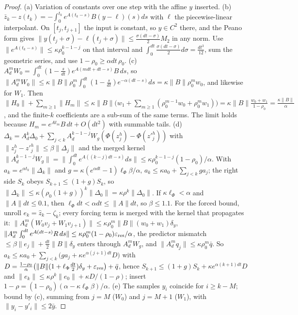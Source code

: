 \begin{proof}
(a) Variation of constants over one step with the affine $y$ inserted.
(b) $\bar z_k-z(t_k)=-\int_0^{t_k}e^{A(t_k-s)}B(y-\ell)(s)ds$ with $\ell$ the piecewise-linear
interpolant. On $[t_j,t_{j+1}]$ the input is constant, so $y\in C^2$ there, and the Peano form gives
$\|y(t_j+\sigma)-\ell(t_j+\sigma)\|\le\tfrac{\sigma(dt-\sigma)}2M_2$ in any norm. Use
$\|e^{A(t_k-s)}\|\le\kappa\rho_0^{k-1-j}$ on that interval and $\int_0^{dt}\tfrac{\sigma(dt-\sigma)}2d\sigma=\tfrac{dt^3}{12}$,
sum the geometric series, and use $1-\rho_0\ge\alpha dt\,\rho_0$.
(c) $A_d^mW_0=\int_0^{dt}(1-\tfrac s{dt})e^{A(mdt+dt-s)}B\,ds$, so
$\|A_d^mW_0\|\le\kappa\|B\|\rho_0^m\int_0^{dt}(1-\tfrac s{dt})e^{-\alpha(dt-s)}ds=\kappa\|B\|\rho_0^mw_0$, and likewise
for $W_1$. Then $\|H_0\|+\sum_{m\ge1}\|H_m\|\le\kappa\|B\|\big(w_1+\sum_{m\ge1}(\rho_0^{m-1}w_0+\rho_0^mw_1)\big)=\kappa\|B\|\frac{w_0+w_1}{1-\rho_0}=\frac{\kappa\|B\|}\alpha$,
and the finite-$k$ coefficients are a sub-sum of the same terms. The limit holds because
$H_m=e^{At_m}B\,dt+O(dt^2)$ with summable tails.
(d) $\Delta_k=A_d^k\Delta_0+\sum_{j<k}A_d^{k-1-j}W_g(\Phi(z^h_j)-\Phi(z'^h_j))$ with
$\|z^h_j-z'^h_j\|\le\beta\|\Delta_j\|$ and the merged kernel
$\|A_d^{k-1-j}W_g\|=\|\int_0^{dt}e^{A((k-j)dt-s)}ds\|\le\kappa\rho_0^{k-1-j}(1-\rho_0)/\alpha$. With
$a_k=e^{\alpha t_k}\|\Delta_k\|$ and $g=\kappa(e^{\alpha dt}-1)\ell_\Phi\beta/\alpha$, $a_k\le\kappa a_0+\sum_{j<k}ga_j$;
the right side $S_k$ obeys $S_{k+1}\le(1+g)S_k$, so $\|\Delta_k\|\le\kappa(\rho_0(1+g))^k\|\Delta_0\|=\kappa\rho^k\|\Delta_0\|$.
If $\kappa\ell_\Phi<\alpha$ and $\|A\|dt\le0.1$, then $\ell_\Phi dt<\alpha dt\le\|A\|dt$, so $\beta\le1.1$.
For the forced bound, unroll $e_k=\hat z_k-\zeta_k$; every forcing term is merged with the kernel
that propagates it: $\|A_d^{m}(W_0v_j+W_1v_{j+1})\|\le\kappa\rho_0^{m}\|B\|(w_0+w_1)\delta_y$,
$\|A_d^m\int_0^{dt}e^{A(dt-s)}R\,ds\|\le\kappa\rho_0^m(1-\rho_0)\varepsilon_{\rm res}/\alpha$, the predictor mismatch
$\le\beta\|e_j\|+\tfrac{dt}2\|B\|\delta_y$ enters through $A_d^mW_g$, and $\|A_d^mq_j\|\le\kappa\rho_0^m\bar q$. So
$a_k\le\kappa a_0+\sum_{j<k}\big(ga_j+\kappa e^{\alpha(j+1)dt}D\big)$ with
$D=\frac{1-\rho_0}{\alpha}\big(\|B\|(1+\ell_\Phi\tfrac{dt}2)\delta_y+\varepsilon_{\rm res}\big)+\bar q$, hence
$S_{k+1}\le(1+g)S_k+\kappa e^{\alpha(k+1)dt}D$ and $\|e_k\|\le\kappa\rho^k\|e_0\|+\kappa D/(1-\rho)$; insert
$1-\rho=(1-\rho_0)(\alpha-\kappa\ell_\Phi\beta)/\alpha$.
(e) The samples $y_i$ coincide for $i\ge k-M$; bound by (c), summing from $j=M$ ($W_0$) and $j=M+1$
($W_1$), with $\|y_i-y'_i\|\le2\bar y$.
\end{proof}

